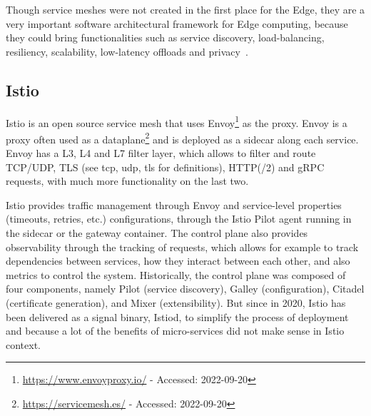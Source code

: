 Though service meshes were not created in the first place for the
Edge, they are a very important software architectural framework for
Edge computing, because they could bring functionalities such as
service discovery, load-balancing, resiliency, scalability,
low-latency offloads and privacy~\cite{GRRL+21, LLGZG19}.



\subsection{Istio~\cite{SS20}}
\label{sec:soa-istio}

Istio is an open source service mesh that uses
Envoy\footnote{\url{https://www.envoyproxy.io/} - Accessed:
  2022-09-20} as the proxy.
%
Envoy is a proxy often used as a
dataplane\footnote{\url{https://servicemesh.es/} - Accessed:
  2022-09-20} and is deployed as a sidecar along each service.
%
Envoy has a L3, L4 and L7 filter layer, which allows to filter and
route \acrshort{TCP}/\acrshort{UDP}, \acrshort{TLS} (see \gls{tcp},
\gls{udp}, \gls{tls} for definitions), HTTP(/2) and \acrshort{gRPC}
requests, with much more functionality on the last two.


Istio provides traffic management through Envoy and service-level
properties (timeouts, retries, etc.) configurations, through the Istio
Pilot agent running in the sidecar or the gateway container.
%
The control plane also provides observability through the tracking of
requests, which allows for example to track dependencies between
services, how they interact between each other, and also metrics to
control the system.
%
Historically, the control plane was composed of four components,
namely Pilot (service discovery), Galley (configuration), Citadel
(certificate generation), and Mixer (extensibility).
%
But since in 2020, Istio has been delivered as a signal binary,
Istiod, to simplify the process of deployment and because a lot of the
benefits of micro-services did not make sense in Istio context.

